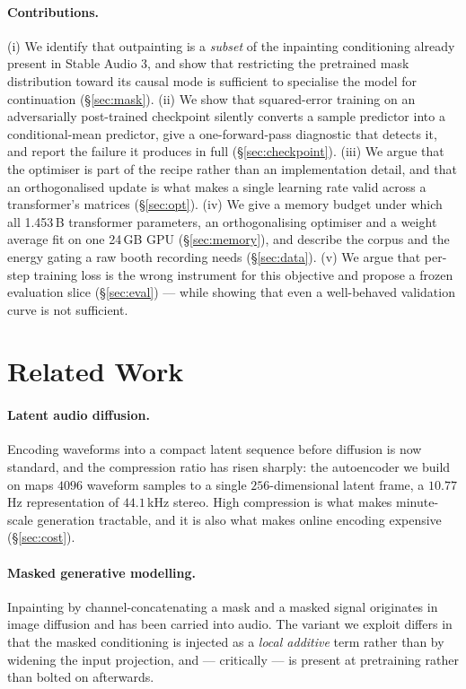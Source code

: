 \documentclass[10pt,twocolumn,letterpaper]{article}
\begin{document}
\paragraph{Contributions.} (i) We identify that outpainting is a \emph{subset} of the
inpainting conditioning already present in Stable Audio 3, and show that restricting the
pretrained mask distribution toward its causal mode is sufficient to specialise the model
for continuation (\S\ref{sec:mask}). (ii) We show that squared-error training on an
adversarially post-trained checkpoint silently converts a sample predictor into a
conditional-mean predictor, give a one-forward-pass diagnostic that detects it, and
report the failure it produces in full (\S\ref{sec:checkpoint}).
(iii) We argue that the optimiser is part of the recipe rather than an implementation
detail, and that an orthogonalised update is what makes a single learning rate valid
across a transformer's matrices (\S\ref{sec:opt}). (iv) We give a memory budget under
which all 1.453\,B transformer parameters, an orthogonalising optimiser and a weight
average fit on one 24\,GB GPU (\S\ref{sec:memory}), and describe the corpus and the
energy gating a raw booth recording needs (\S\ref{sec:data}). (v) We argue that per-step training loss is
the wrong instrument for this objective and propose a frozen evaluation slice
(\S\ref{sec:eval}) --- while showing that even a well-behaved validation curve is not
sufficient.

\section{Related Work}

\paragraph{Latent audio diffusion.} Encoding waveforms into a compact latent sequence
before diffusion is now standard, and the compression ratio has risen sharply: the
autoencoder we build on maps $4096$ waveform samples to a single $256$-dimensional latent
frame, a $10.77$\,Hz representation of $44.1$\,kHz stereo. High compression is what makes
minute-scale generation tractable, and it is also what makes online encoding expensive
(\S\ref{sec:cost}).

\paragraph{Masked generative modelling.} Inpainting by channel-concatenating a mask and a
masked signal originates in image diffusion and has been carried into audio. The variant
we exploit differs in that the masked conditioning is injected as a \emph{local additive}
term rather than by widening the input projection, and --- critically --- is present at
pretraining rather than bolted on afterwards.
\end{document}
